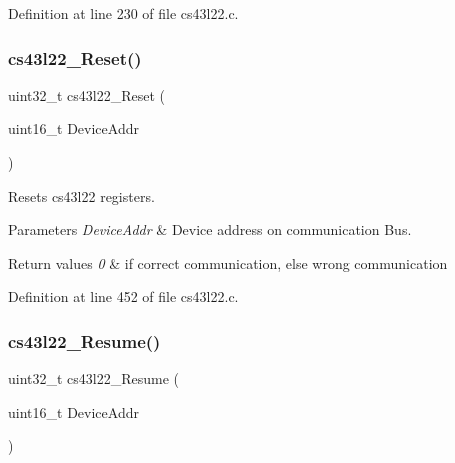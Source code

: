 Definition at line 230 of file cs43l22.\+c.

\mbox{\label{group___c_s43_l22___private___functions_ga647488feb466972a5557a2fe2e9350e7}} 
\subsubsection{\texorpdfstring{cs43l22\+\_\+\+Reset()}{cs43l22\_Reset()}}
{\footnotesize\ttfamily uint32\+\_\+t cs43l22\+\_\+\+Reset (\begin{DoxyParamCaption}\item[{uint16\+\_\+t}]{Device\+Addr }\end{DoxyParamCaption})}



Resets cs43l22 registers. 


\begin{DoxyParams}{Parameters}
{\em Device\+Addr} & Device address on communication Bus. \\
\hline
\end{DoxyParams}

\begin{DoxyRetVals}{Return values}
{\em 0} & if correct communication, else wrong communication \\
\hline
\end{DoxyRetVals}


Definition at line 452 of file cs43l22.\+c.

\mbox{\label{group___c_s43_l22___private___functions_ga579c0ef6455060e9117632f8d83d606a}} 
\subsubsection{\texorpdfstring{cs43l22\+\_\+\+Resume()}{cs43l22\_Resume()}}
{\footnotesize\ttfamily uint32\+\_\+t cs43l22\+\_\+\+Resume (\begin{DoxyParamCaption}\item[{uint16\+\_\+t}]{Device\+Addr }\end{DoxyParamCaption})}



